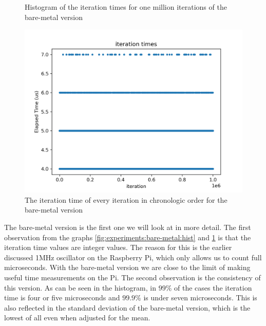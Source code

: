 \begin{figure}[h]
  \begin{center}
    \begin{minipage}{0.48\textwidth}
      \begin{center}
        \caption{Histogram of the iteration times for one million iterations of the bare-metal version}
        \label{fig:experiments:bare-metal:hist}
      \end{center}
    \end{minipage}
    \hspace{0.02\textwidth}
    \begin{minipage}{0.48\textwidth}
      \begin{center}
        \includegraphics[width=\textwidth]{assets/bare-metal/times.png}
        \caption{The iteration time of every iteration in chronologic order for the bare-metal version}
        \label{fig:experiments:bare-metal:times}
      \end{center}
    \end{minipage}
  \end{center}
\end{figure}

The bare-metal version is the first one we will look at in more detail.
The first observation from the graphs \ref{fig:experiments:bare-metal:hist} and \ref{fig:experiments:bare-metal:times} is that the iteration time values are integer values.
The reason for this is the earlier discussed 1MHz oscillator on the Raspberry Pi, which only allows us to count full microseconds.
With the bare-metal version we are close to the limit of making useful time measurements on the Pi.
The second observation is the consistency of this version.
As can be seen in the histogram, in $99\%$ of the cases the iteration time is four or five microseconds and $99.9\%$ is under seven microseconds.
This is also reflected in the standard deviation of the bare-metal version, which is the lowest of all even when adjusted for the mean.

